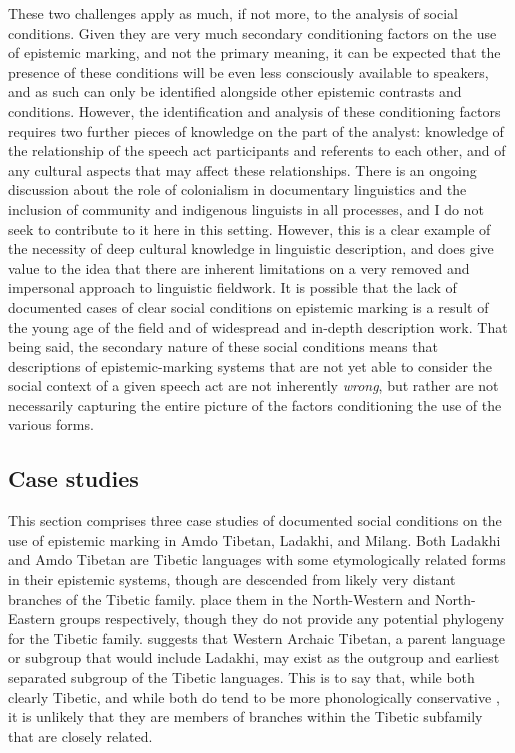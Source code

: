 These two challenges apply as much, if not more, to the analysis of social conditions. Given they are very much secondary conditioning factors on the use of epistemic marking, and not the primary meaning, it can be expected that the presence of these conditions will be even less consciously available to speakers, and as such can only be identified alongside other epistemic contrasts and conditions. However, the identification and analysis of these conditioning factors requires two further pieces of knowledge on the part of the analyst: knowledge of the relationship of the speech act participants and referents to each other, and of any cultural aspects that may affect these relationships. There is an ongoing discussion about the role of colonialism in documentary linguistics and the inclusion of community and indigenous linguists in all processes, and I do not seek to contribute to it here in this setting. However, this is a clear example of the necessity of deep cultural knowledge in linguistic description, and does give value to the idea that there are inherent limitations on a very removed and impersonal approach to linguistic fieldwork. It is possible that the lack of documented cases of clear social conditions on epistemic marking is a result of the young age of the field and of widespread and in-depth description work. That being said, the secondary nature of these social conditions means that descriptions of epistemic-marking systems that are not yet able to consider the social context of a given speech act are not inherently \textit{wrong}, but rather are not necessarily capturing the entire picture of the factors conditioning the use of the various forms.

\subsection{Case studies}\label{ss:Discussion:SocialCases}
This section comprises three case studies of documented social conditions on the use of epistemic marking in Amdo Tibetan, Ladakhi, and Milang. Both Ladakhi and Amdo Tibetan are Tibetic languages with some etymologically related forms in their epistemic systems, though are descended from likely very distant branches of the Tibetic family.  place them in the North-Western and North-Eastern groups respectively, though they do not provide any potential phylogeny for the Tibetic family.  suggests that Western Archaic Tibetan, a parent language or subgroup that would include Ladakhi, may exist as the outgroup and earliest separated subgroup of the Tibetic languages. This is to say that, while both clearly Tibetic, and while both do tend to be more phonologically conservative \cites{Tribur2019}{Zemp2018}, it is unlikely that they are members of branches within the Tibetic subfamily that are closely related.

